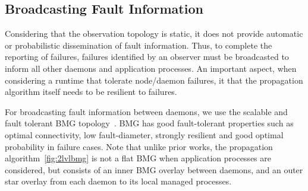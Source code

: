 \documentclass[sigconf]{acmart}
\begin{document}

\subsection{Broadcasting Fault Information}
Considering that the observation topology is static, it does not provide
automatic or probabilistic dissemination of fault information. Thus, to complete
the reporting of failures, failures identified by an observer must be broadcasted
to inform all other daemons and application processes. An important aspect,
when considering a runtime that tolerate node/daemon failures, it that the
propagation algorithm itself needs to be resilient to failures.

For broadcasting fault information between daemons, we use the scalable and fault
tolerant BMG topology~\cite{Angskun07}. BMG has good fault-tolerant properties such
as optimal connectivity, low fault-diameter, strongly resilient and good optimal
probability in failure cases. Note that unlike prior works, the propagation
algorithm~\ref{fig:2lvlbmg} is not a flat BMG when application processes are considered, but consists of an
inner BMG overlay between daemons, and an outer star overlay from each daemon to its
local managed processes.
\end{document}
